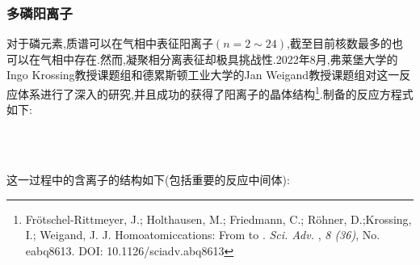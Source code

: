 \documentclass{ctexart}
\begin{document}
\subsubsection{多磷阳离子}
对于磷元素,质谱可以在气相中表征阳离子\ce{[P_n]+}$(n=2\sim24)$,截至目前核数最多的\ce{[P91]+}也可以在气相中存在.然而,凝聚相分离表征\ce{[P_n]+}却极具挑战性.2022年8月,弗莱堡大学的Ingo Krossing教授课题组和德累斯顿工业大学的Jan Weigand教授课题组对这一反应体系进行了深入的研究,并且成功的获得了\ce{[P9]+}阳离子的晶体结构\footnote{Frötschel-Rittmeyer, J.; Holthausen, M.; Friedmann, C.; Röhner, D.;Krossing,  I.; Weigand, J. J. Homoatomiccations: From \ce{[P5]+} to \ce{[P9]+}. \textit{Sci. Adv.} , \textit{8 (36)}, No. eabq8613. DOI: 10.1126/sciadv.abq8613}.制备的反应方程式如下:
\begin{center}
    \\
    \\
\end{center}
这一过程中的含离子的结构如下(包括重要的反应中间体\ce{[P5]+}):
\end{document}
